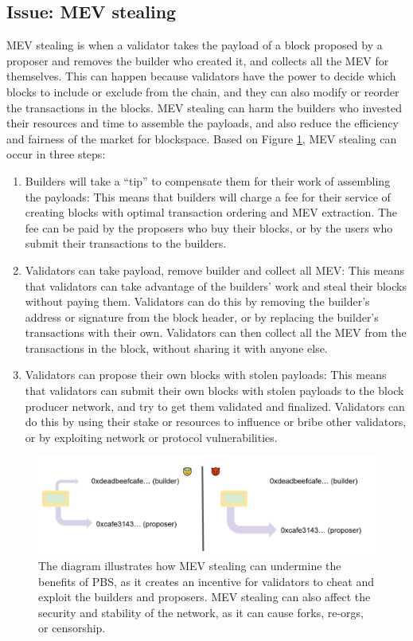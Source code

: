 \subsection{Issue: MEV stealing}
MEV stealing is when a validator takes the payload of a block proposed by a proposer and removes the builder who created it, and collects all the MEV for themselves. This can happen because validators have the power to decide which blocks to include or exclude from the chain, and they can also modify or reorder the transactions in the blocks. MEV stealing can harm the builders who invested their resources and time to assemble the payloads, and also reduce the efficiency and fairness of the market for blockspace.
Based on Figure \ref{fig:L22_f4}, MEV stealing can occur in three steps:
\begin{enumerate}
	\item Builders will take a “tip” to compensate them for their work of assembling the payloads: This means that builders will charge a fee for their service of creating blocks with optimal transaction ordering and MEV extraction. The fee can be paid by the proposers who buy their blocks, or by the users who submit their transactions to the builders.
	\item Validators can take payload, remove builder and collect all MEV: This means that validators can take advantage of the builders’ work and steal their blocks without paying them. Validators can do this by removing the builder’s address or signature from the block header, or by replacing the builder’s transactions with their own. Validators can then collect all the MEV from the transactions in the block, without sharing it with anyone else.
	\item Validators can propose their own blocks with stolen payloads: This means that validators can submit their own blocks with stolen payloads to the block producer network, and try to get them validated and finalized. Validators can do this by using their stake or resources to influence or bribe other validators, or by exploiting network or protocol vulnerabilities.
\end{enumerate}
\begin{center}
	\begin{figure}
		\centering
		\includegraphics[width=0.8\linewidth]{Fig/22/F4}
		\caption{The diagram illustrates how MEV stealing can undermine the benefits of PBS, as it creates an incentive for validators to cheat and exploit the builders and proposers. MEV stealing can also affect the security and stability of the network, as it can cause forks, re-orgs, or censorship.}
		\label{fig:L22_f4}
	\end{figure}
\end{center}
